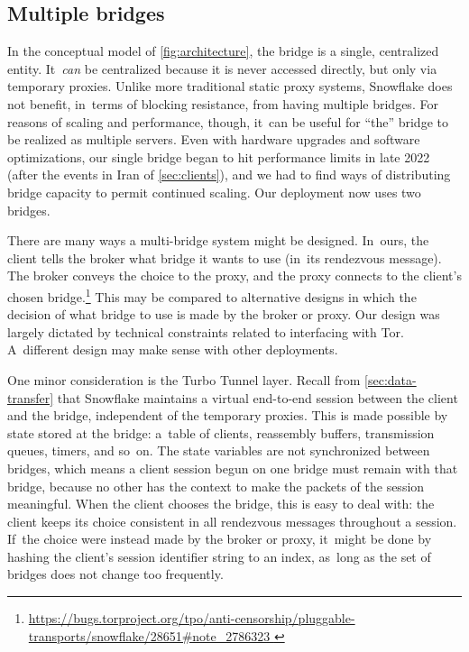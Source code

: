 \documentclass[letterpaper,twocolumn]{article}
\newlength{\urlfootnotesize}
\newcommand{\urlfootnote}[1]{\footnote{
\raggedright\hangindent\footnotemargin%
\fontsize{\urlfootnotesize}{\urlfootnotesize}\selectfont%
\url{#1}
}}
\begin{document}
\subsection{Multiple bridges}
\label{sec:multi-bridge}


In the conceptual model of \autoref{fig:architecture}, the bridge
is a single, centralized entity.
It~\emph{can} be centralized
because it is never accessed directly,
but only via temporary proxies.
Unlike more traditional static proxy systems,
Snowflake does not benefit, in~terms of blocking resistance,
from having multiple bridges.
For reasons of scaling and performance, though,
it~can be useful for ``the'' bridge to be realized as
multiple servers.
Even with hardware upgrades and software optimizations,
our single bridge began to hit performance limits
in late 2022 (after the events in Iran of \autoref{sec:clients}),
and we had to find ways of distributing bridge capacity
to permit continued scaling.
Our deployment now uses two bridges.

There are many ways a multi-bridge system
might be designed.
In~ours,
the client tells the broker
what bridge it wants to use
(in~its rendezvous message).
The broker conveys the choice to the proxy,
and the proxy connects to the client's chosen bridge.\urlfootnote{
https://bugs.torproject.org/tpo/anti-censorship/pluggable-transports/snowflake/28651\#note_2786323
}
This may be compared to alternative designs
in which the decision of what bridge to use
is made by the broker or proxy.
Our design was largely dictated by technical constraints
related to interfacing with Tor.
A~different design may make sense with other deployments.

One minor consideration is the Turbo Tunnel layer.
Recall from \autoref{sec:data-transfer} that Snowflake
maintains a virtual end-to-end session
between the client and the bridge,
independent of the temporary proxies.
This is made possible by state stored at the bridge:
a~table of clients, reassembly buffers,
transmission queues, timers, and so~on.
The state variables are not synchronized between bridges,
which means a client session begun on one bridge
must remain with that bridge,
because no other
has the context to make the packets
of the session meaningful.
When the client chooses the bridge,
this is easy to deal with:
the client keeps its choice consistent
in all rendezvous messages throughout a session.
If~the choice were instead made by the broker or proxy,
it~might be done by hashing
the client's session identifier string to an index,
as~long as the set of bridges does not change too frequently.
\end{document}
